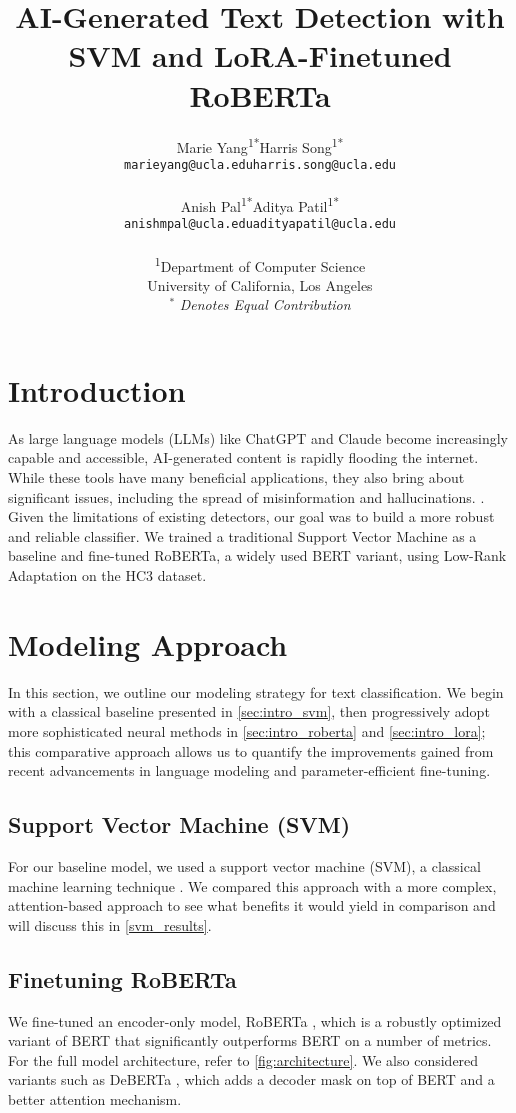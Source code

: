 \documentclass[11pt]{article}
\title{AI-Generated Text Detection with SVM and LoRA-Finetuned RoBERTa}
\author{
\begin{tabular}{cc}
Marie Yang\textsuperscript{1}\textsuperscript{*} & Harris Song\textsuperscript{1}\textsuperscript{*} \\
\texttt{marieyang@ucla.edu} & \texttt{harris.song@ucla.edu} \\
\\ %
Anish Pal\textsuperscript{1}\textsuperscript{*} & Aditya Patil\textsuperscript{1}\textsuperscript{*} \\
\texttt{anishmpal@ucla.edu} & \texttt{adityapatil@ucla.edu}
\end{tabular}
\\
\textsuperscript{1}Department of Computer Science \\
University of California, Los Angeles \\
$^{*}$ \textit{Denotes Equal Contribution}
}
\begin{document}
\maketitle
\section{Introduction}


As large language models (LLMs) like ChatGPT and Claude become increasingly capable and accessible, AI-generated content is rapidly flooding the internet. While these tools have many beneficial applications, they also bring about significant issues, including the spread of misinformation and hallucinations.  \cite{xu2024inevitable}. Given the limitations of existing detectors, our goal was to build a more robust and reliable classifier. We trained a traditional Support Vector Machine as a baseline and fine-tuned RoBERTa, a widely used BERT variant, using Low-Rank Adaptation on the HC3 dataset. 


\section{Modeling Approach}
In this section, we outline our modeling strategy for text classification. We begin with a classical baseline presented in \autoref{sec:intro_svm}, then progressively adopt more sophisticated neural methods in \autoref{sec:intro_roberta} and \autoref{sec:intro_lora}; this comparative approach allows us to quantify the improvements gained from recent advancements in language modeling and parameter-efficient fine-tuning.
\subsection{Support Vector Machine (SVM)}
\label{sec:intro_svm}
For our baseline model, we used a support vector machine (SVM), a classical machine learning technique \cite{cortes1995support}. We compared this approach with a more complex, attention-based approach to see what benefits it would yield in comparison and will discuss this in \autoref{svm_results}.


\subsection{Finetuning RoBERTa}
\label{sec:intro_roberta}
We fine-tuned an encoder-only model, RoBERTa \cite{liu2020roberta}, which is a robustly optimized variant of BERT that significantly outperforms BERT on a number of metrics. For the full model architecture, refer to \autoref{fig:architecture}. We also considered variants such as DeBERTa \cite{he2021deberta}, which adds a decoder mask on top of BERT and a better attention mechanism. 
\end{document}
